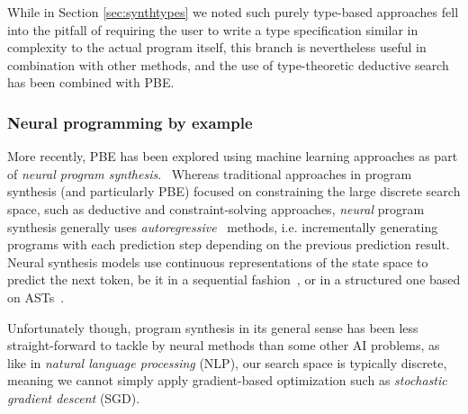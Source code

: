 \documentclass{article}
\begin{document}

While in Section \ref{sec:synthtypes} we noted such purely type-based
approaches fell into the pitfall of requiring the user to write a
type specification similar in complexity to the actual program itself,
this branch is nevertheless useful in combination with other methods,
and the use of type-theoretic deductive search has been combined with PBE.~\citep{myth}


\subsubsection{Neural programming by example} \label{sec:neuralpbe}

More recently, PBE has been explored using machine learning approaches as part of \emph{neural program synthesis}.~\citep{nps}
Whereas traditional approaches in program synthesis (and particularly PBE) focused on constraining the large discrete search space,
such as deductive and constraint-solving approaches,
\emph{neural} program synthesis generally uses \emph{autoregressive}~\citep{kendall1944autoregressive} methods,
i.e. incrementally generating programs with each prediction step depending on the previous prediction result.
Neural synthesis models use continuous representations of the state space to predict the next token,
be it in a sequential fashion~\citep{npi,neuralmachinetranslation,alphanpi},
or in a structured one based on ASTs~\citep{nsps}.

Unfortunately though, program synthesis in its general sense has been less straight-forward to tackle by neural methods than some other AI problems,
as like in \emph{natural language processing} (NLP),
our search space is typically discrete, meaning we cannot simply apply gradient-based optimization such as \emph{stochastic gradient descent} (SGD).~\citep{nps}
\end{document}
